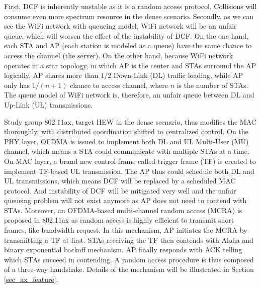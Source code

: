 \documentclass[journal]{IEEEtran}
\begin{document}
First, DCF is inherently unstable as it is a random access protocol. 
Collisions will consume even more spectrum resource in the dense scenario. 
Secondly, as we can see the WiFi network with queueing model, WiFi network will be an unfair queue, which will worsen the effect of the instability of DCF. 
On the one hand, each STA and AP  (each station is modeled as a queue) have the same chance to access the channel (the server). 
On the other hand, because WiFi network operates in a star topology, in which AP is the center and STAs surround the AP logically, AP shares more than $1/2$ Down-Link (DL) traffic loading, while AP only has $1/(n+1)$ chance to access channel, where $n$ is the number of STAs.
The queue model of WiFi network is, therefore, an unfair queue between DL and Up-Link (UL) transmissions. 


Study group 802.11ax, target HEW in the dense scenario, thus modifies the MAC thoroughly, with distributed coordination shifted to centralized control. 
On the PHY layer, OFDMA is issued to implement both DL and UL Multi-User (MU) channel, which means a STA could communicate with multiple STAs at a time.
On MAC layer, a brand new control frame called trigger frame (TF) is created to implement TF-based UL transmission. 
The AP thus could schedule both DL and UL transmissions, which means DCF will be replaced by a scheduled MAC protocol. 
And instability of DCF will be mitigated very well and the unfair queueing problem will not exist anymore as AP does not need to contend with STAs.
Moreover, an OFDMA-based multi-channel random access (MCRA) is proposed in 802.11ax as random access is highly efficient to transmit short frames, like bandwidth request. 
In this mechanism, AP initiates the MCRA by transmitting a TF at first. 
STAs receiving the TF then contends with Aloha and binary exponential backoff mechanism. 
AP finally responds with ACK telling which STAs succeed in contending.
A random access procedure is thus composed of a three-way handshake. 
Details of the mechanism will be illustrated in Section \ref{sec_ax_feature}.
\end{document}
